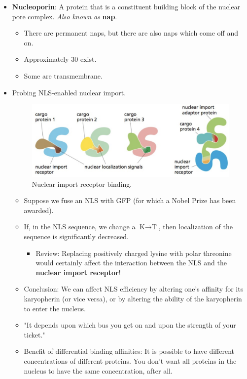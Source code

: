 \documentclass[../notes.tex]{subfiles}
\begin{document}
\begin{itemize}
\begin{itemize}
\begin{itemize}
        \end{itemize}
    \end{itemize}
    \item \textbf{Nucleoporin}: A protein that is a constituent building block of the nuclear pore complex. \emph{Also known as} \textbf{nap}.
    \begin{itemize}
        \item There are permanent naps, but there are also naps which come off and on.
        \item Approximately 30 exist.
        \item Some are transmembrane.
    \end{itemize}
    \item Probing NLS-enabled nuclear import.
    \begin{figure}[H]
        \centering
        \includegraphics[width=0.5\linewidth]{../ExtFiles/NLSimport.png}
        \caption{Nuclear import receptor binding.}
        \label{fig:NLSimport}
    \end{figure}
    \begin{itemize}
        \item Suppose we fuse an NLS with GFP (for which a Nobel Prize has been awarded).
        \item If, in the NLS sequence, we change a $\text{K}\to\text{T}$, then localization of the sequence is significantly decreased.
        \begin{itemize}
            \item Review: Replacing positively charged lysine with polar threonine would certainly affect the interaction between the NLS and the \textbf{nuclear import receptor}!
        \end{itemize}
        \item Conclusion: We can affect NLS efficiency by altering one's affinity for its karyopherin (or vice versa), or by altering the ability of the karyopherin to enter the nucleus.
        \item "It depends upon which bus you get on and upon the strength of your ticket."
        \item Benefit of differential binding affinities: It is possible to have different concentrations of different proteins. You don't want all proteins in the nucleus to have the same concentration, after all.

\end{itemize}
\end{itemize}
\end{document}
